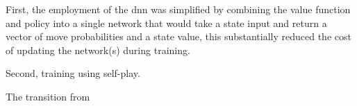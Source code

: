 First, the employment of the \gls{dnn} was simplified by combining the value function and policy 
into a single network that would take a state input and return a vector of move probabilities and 
a state value, this substantially reduced the cost of updating the network(s) during training.




Second,
training using self-play.




The transition from 






\begin{comment}
AlphaGo Zero’s Innovation
AlphaGo Zero represented a significant leap forward by eliminating the need for human expert knowledge. Unlike its predecessor, AlphaGo Zero learned to play Go entirely from self-play, starting with random moves and improving solely through reinforcement learning.
	•	Key Techniques:
	•	Self-Play Learning: AlphaGo Zero trained by playing games against itself, using a single neural network that combined the policy and value functions.
	•	Simplified Architecture: The simplified neural network architecture and reliance on self-play allowed for more efficient training and faster improvement.
	•	Key Paper: Silver, D. et al. (2017). Mastering the game of Go without human knowledge.
Impact
AlphaGo Zero’s success underscored the potential of self-play and reinforcement learning to achieve superhuman performance without human intervention. This approach demonstrated the scalability and generality of MARL techniques, opening new possibilities for their application in other domains.

AlphaStar: Expanding to Real-Time Strategy Games
AlphaStar’s Achievement
AlphaStar extended the principles of MARL to the domain of real-time strategy (RTS) games by achieving grandmaster-level performance in StarCraft II, a game known for its strategic depth, real-time decision-making, and partial observability.

	•	Key Techniques:
	•	Multi-Agent Learning: AlphaStar was trained using a league of agents that played against each other, promoting diverse strategies and robust learning.
	•	Imitation and Reinforcement Learning: AlphaStar initially used imitation learning from human expert games, followed by reinforcement learning through self-play to refine its strategies.
	•	Modular Neural Network Architecture: The architecture included components for managing different aspects of the game, such as strategy, tactics, and unit control.
	•	Key Paper: Vinyals, O. et al. (2019). Grandmaster level in StarCraft II using multi-agent reinforcement learning.


\end{comment}
